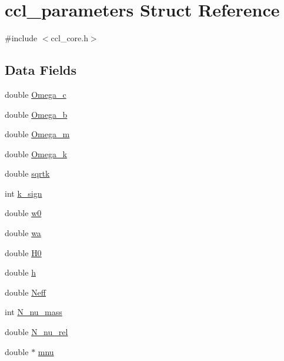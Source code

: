 \hypertarget{structccl__parameters}{}\section{ccl\+\_\+parameters Struct Reference}
\label{structccl__parameters}


{\ttfamily \#include $<$ccl\+\_\+core.\+h$>$}

\subsection*{Data Fields}
\begin{DoxyCompactItemize}
\item 
double \mbox{\hyperlink{structccl__parameters_a22294253cd0ef6cfc502ff7832729b1d}{Omega\+\_\+c}}
\item 
double \mbox{\hyperlink{structccl__parameters_ad27d743b348cde1051184f497e7e825e}{Omega\+\_\+b}}
\item 
double \mbox{\hyperlink{structccl__parameters_ad3693ce8fafeecf7a97dd9979ab77214}{Omega\+\_\+m}}
\item 
double \mbox{\hyperlink{structccl__parameters_a902d19139eb90fb6efdf949bc963916c}{Omega\+\_\+k}}
\item 
double \mbox{\hyperlink{structccl__parameters_a9fecdefe2eef4ffa7ac866d9e64497cf}{sqrtk}}
\item 
int \mbox{\hyperlink{structccl__parameters_ae03ae536552bf54fbe6d6d80050b4b9f}{k\+\_\+sign}}
\item 
double \mbox{\hyperlink{structccl__parameters_a9261f6431c8611e66833061ec9790b4c}{w0}}
\item 
double \mbox{\hyperlink{structccl__parameters_acdbe3508eec17046824f497225bde82e}{wa}}
\item 
double \mbox{\hyperlink{structccl__parameters_a89f7b707d3328ea1805fdb3ba869a722}{H0}}
\item 
double \mbox{\hyperlink{structccl__parameters_ad6c1f6629cea1ae0785cea8f3a2fa7af}{h}}
\item 
double \mbox{\hyperlink{structccl__parameters_aaf4ecec9a7751628e060b8f4fe9f38b6}{Neff}}
\item 
int \mbox{\hyperlink{structccl__parameters_acb78ae9fa37db953c41f0931e7999098}{N\+\_\+nu\+\_\+mass}}
\item 
double \mbox{\hyperlink{structccl__parameters_a1cddffb1b86ce4c63c0ba01b3b9d1503}{N\+\_\+nu\+\_\+rel}}
\item 
double $\ast$ \mbox{\hyperlink{structccl__parameters_a3d1b57e1adfc67db58b090f48e73b749}{mnu}}

\end{DoxyCompactItemize}
